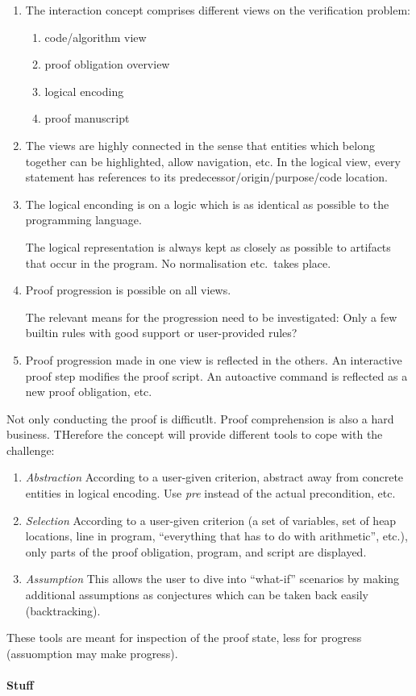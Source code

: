 \documentclass{article}
\begin{document}
\begin{enumerate}
\item The interaction concept comprises different views on the
  verification problem:
  \begin{enumerate}
  \item code/algorithm view
  \item proof obligation overview
  \item logical encoding
  \item proof manuscript
  \end{enumerate}

\item The views are highly connected in the sense that entities which
  belong together can be highlighted, allow navigation, etc.  In the
  logical view, every statement has references to its
  predecessor/origin/purpose/code location.

\item The logical enconding is on a logic which is as identical as
  possible to the programming language.

  The logical representation is always kept as closely as possible to
  artifacts that occur in the program. No normalisation etc.\ takes
  place.

\item Proof progression is possible on all views.

  The relevant means for the progression need to be investigated: Only
  a few builtin rules with good support or user-provided rules?

\item Proof progression made in one view is reflected in the others.
  An interactive proof step modifies the proof script. An autoactive
  command is reflected as a new proof obligation, etc.
\end{enumerate}

Not only conducting the proof is difficutlt. Proof comprehension is
also a hard business. THerefore the concept will provide different
tools to cope with the challenge:
\begin{enumerate}
\item \emph{Abstraction} According to a user-given criterion, abstract
  away from concrete entities in logical encoding. Use \emph{pre}
  instead of the actual precondition, etc.
\item \emph{Selection} According to a user-given criterion (a set of
  variables, set of heap locations, line in program, ``everything that
  has to do with arithmetic'', etc.), only parts of the proof
  obligation, program, and script are displayed.
\item \emph{Assumption} This allows the user to dive into ``what-if''
  scenarios by making additional assumptions as conjectures which can
  be taken back easily (backtracking).
\end{enumerate}
These tools are meant for inspection of the proof state, less for
progress (assuomption may make progress).

\paragraph{Stuff}
\end{document}

